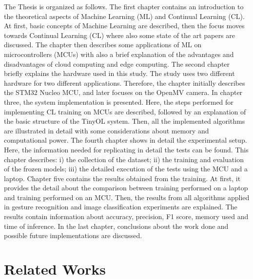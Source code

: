\documentclass[12pt]{report}
\newcommand\blankpage{%
    \null
    \thispagestyle{empty}%
    \addtocounter{page}{0}%
    \newpage}
\begin{document}
The Thesis is organized as follows. The first chapter contains an introduction to the theoretical aspects of Machine Learning (ML) and Continual Learning (CL). At first, basic concepts of Machine Learning are described, then the focus moves towards Continual Learning (CL) where also some state of the art papers are discussed. The chapter then describes some applications of ML on microcontrollers (MCUs) with also a brief explanation of the advantages and disadvantages of cloud computing and edge computing. The second chapter briefly explains the hardware used in this study. The study uses two different hardware for two different applications. Therefore, the chapter initially describes the STM32 Nucleo MCU, and later focuses on the OpenMV camera. In chapter three, the system implementation is presented. Here, the steps performed for implementing CL training on MCUs are described, followed by an explanation of the basic structure of the TinyOL system. Then, all the implemented algorithms are illustrated in detail with some considerations about memory and computational power. The fourth chapter shows in detail the experimental setup. Here, the information needed for replicating in detail the tests can be found. This chapter describes: i) the collection of the dataset; ii) the training and evaluation of the frozen models; iii) the detailed execution of the tests using the MCU and a laptop. Chapter five contains the results obtained from the training. At first, it provides the detail about the comparison between training performed on a laptop and training performed on an MCU. Then, the results from all algorithms applied in gesture recognition and image classification experiments are explained. The results contain information about accuracy, precision, F1 score, memory used and time of inference. In the last chapter, conclusions about the work done and possible future implementations are discussed.

\afterpage{\blankpage}
\chapter{Related Works} \label{chap:relworks}
\end{document}
